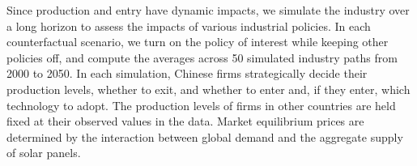 \documentclass[12pt]{article}
\begin{document}


Since production and entry have dynamic impacts, we simulate the industry over a long horizon to assess the impacts of various industrial policies. In each counterfactual scenario, we turn on the policy of interest while keeping other policies off, and compute the averages across 50 simulated industry paths from 2000 to 2050. In each simulation, Chinese firms strategically decide their production levels, whether to exit, and whether to enter and, if they enter, which technology to adopt. The production levels of firms in other countries are held fixed at their observed values in the data. Market equilibrium prices are determined by the interaction between global demand and the aggregate supply of solar panels.
\end{document}
